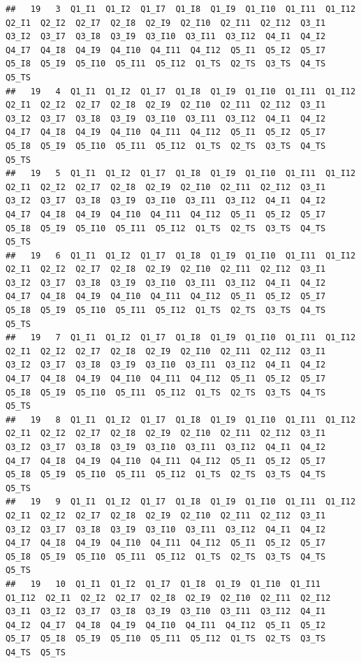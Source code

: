 \documentclass[
]{book}
\begin{document}
\begin{verbatim}
##   19   3  Q1_I1  Q1_I2  Q1_I7  Q1_I8  Q1_I9  Q1_I10  Q1_I11  Q1_I12  Q2_I1  Q2_I2  Q2_I7  Q2_I8  Q2_I9  Q2_I10  Q2_I11  Q2_I12  Q3_I1  Q3_I2  Q3_I7  Q3_I8  Q3_I9  Q3_I10  Q3_I11  Q3_I12  Q4_I1  Q4_I2  Q4_I7  Q4_I8  Q4_I9  Q4_I10  Q4_I11  Q4_I12  Q5_I1  Q5_I2  Q5_I7  Q5_I8  Q5_I9  Q5_I10  Q5_I11  Q5_I12  Q1_TS  Q2_TS  Q3_TS  Q4_TS  Q5_TS
##   19   4  Q1_I1  Q1_I2  Q1_I7  Q1_I8  Q1_I9  Q1_I10  Q1_I11  Q1_I12  Q2_I1  Q2_I2  Q2_I7  Q2_I8  Q2_I9  Q2_I10  Q2_I11  Q2_I12  Q3_I1  Q3_I2  Q3_I7  Q3_I8  Q3_I9  Q3_I10  Q3_I11  Q3_I12  Q4_I1  Q4_I2  Q4_I7  Q4_I8  Q4_I9  Q4_I10  Q4_I11  Q4_I12  Q5_I1  Q5_I2  Q5_I7  Q5_I8  Q5_I9  Q5_I10  Q5_I11  Q5_I12  Q1_TS  Q2_TS  Q3_TS  Q4_TS  Q5_TS
##   19   5  Q1_I1  Q1_I2  Q1_I7  Q1_I8  Q1_I9  Q1_I10  Q1_I11  Q1_I12  Q2_I1  Q2_I2  Q2_I7  Q2_I8  Q2_I9  Q2_I10  Q2_I11  Q2_I12  Q3_I1  Q3_I2  Q3_I7  Q3_I8  Q3_I9  Q3_I10  Q3_I11  Q3_I12  Q4_I1  Q4_I2  Q4_I7  Q4_I8  Q4_I9  Q4_I10  Q4_I11  Q4_I12  Q5_I1  Q5_I2  Q5_I7  Q5_I8  Q5_I9  Q5_I10  Q5_I11  Q5_I12  Q1_TS  Q2_TS  Q3_TS  Q4_TS  Q5_TS
##   19   6  Q1_I1  Q1_I2  Q1_I7  Q1_I8  Q1_I9  Q1_I10  Q1_I11  Q1_I12  Q2_I1  Q2_I2  Q2_I7  Q2_I8  Q2_I9  Q2_I10  Q2_I11  Q2_I12  Q3_I1  Q3_I2  Q3_I7  Q3_I8  Q3_I9  Q3_I10  Q3_I11  Q3_I12  Q4_I1  Q4_I2  Q4_I7  Q4_I8  Q4_I9  Q4_I10  Q4_I11  Q4_I12  Q5_I1  Q5_I2  Q5_I7  Q5_I8  Q5_I9  Q5_I10  Q5_I11  Q5_I12  Q1_TS  Q2_TS  Q3_TS  Q4_TS  Q5_TS
##   19   7  Q1_I1  Q1_I2  Q1_I7  Q1_I8  Q1_I9  Q1_I10  Q1_I11  Q1_I12  Q2_I1  Q2_I2  Q2_I7  Q2_I8  Q2_I9  Q2_I10  Q2_I11  Q2_I12  Q3_I1  Q3_I2  Q3_I7  Q3_I8  Q3_I9  Q3_I10  Q3_I11  Q3_I12  Q4_I1  Q4_I2  Q4_I7  Q4_I8  Q4_I9  Q4_I10  Q4_I11  Q4_I12  Q5_I1  Q5_I2  Q5_I7  Q5_I8  Q5_I9  Q5_I10  Q5_I11  Q5_I12  Q1_TS  Q2_TS  Q3_TS  Q4_TS  Q5_TS
##   19   8  Q1_I1  Q1_I2  Q1_I7  Q1_I8  Q1_I9  Q1_I10  Q1_I11  Q1_I12  Q2_I1  Q2_I2  Q2_I7  Q2_I8  Q2_I9  Q2_I10  Q2_I11  Q2_I12  Q3_I1  Q3_I2  Q3_I7  Q3_I8  Q3_I9  Q3_I10  Q3_I11  Q3_I12  Q4_I1  Q4_I2  Q4_I7  Q4_I8  Q4_I9  Q4_I10  Q4_I11  Q4_I12  Q5_I1  Q5_I2  Q5_I7  Q5_I8  Q5_I9  Q5_I10  Q5_I11  Q5_I12  Q1_TS  Q2_TS  Q3_TS  Q4_TS  Q5_TS
##   19   9  Q1_I1  Q1_I2  Q1_I7  Q1_I8  Q1_I9  Q1_I10  Q1_I11  Q1_I12  Q2_I1  Q2_I2  Q2_I7  Q2_I8  Q2_I9  Q2_I10  Q2_I11  Q2_I12  Q3_I1  Q3_I2  Q3_I7  Q3_I8  Q3_I9  Q3_I10  Q3_I11  Q3_I12  Q4_I1  Q4_I2  Q4_I7  Q4_I8  Q4_I9  Q4_I10  Q4_I11  Q4_I12  Q5_I1  Q5_I2  Q5_I7  Q5_I8  Q5_I9  Q5_I10  Q5_I11  Q5_I12  Q1_TS  Q2_TS  Q3_TS  Q4_TS  Q5_TS
##   19   10  Q1_I1  Q1_I2  Q1_I7  Q1_I8  Q1_I9  Q1_I10  Q1_I11  Q1_I12  Q2_I1  Q2_I2  Q2_I7  Q2_I8  Q2_I9  Q2_I10  Q2_I11  Q2_I12  Q3_I1  Q3_I2  Q3_I7  Q3_I8  Q3_I9  Q3_I10  Q3_I11  Q3_I12  Q4_I1  Q4_I2  Q4_I7  Q4_I8  Q4_I9  Q4_I10  Q4_I11  Q4_I12  Q5_I1  Q5_I2  Q5_I7  Q5_I8  Q5_I9  Q5_I10  Q5_I11  Q5_I12  Q1_TS  Q2_TS  Q3_TS  Q4_TS  Q5_TS

\end{verbatim}
\end{document}
